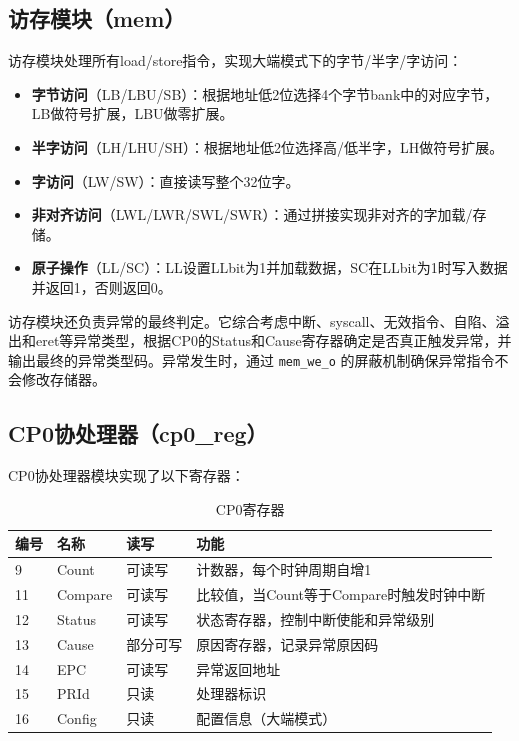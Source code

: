 \subsection{访存模块（mem）}

访存模块处理所有load/store指令，实现大端模式下的字节/半字/字访问：

\begin{itemize}[leftmargin=2em]
    \item \textbf{字节访问}（LB/LBU/SB）：根据地址低2位选择4个字节bank中的对应字节，LB做符号扩展，LBU做零扩展。
    \item \textbf{半字访问}（LH/LHU/SH）：根据地址低2位选择高/低半字，LH做符号扩展。
    \item \textbf{字访问}（LW/SW）：直接读写整个32位字。
    \item \textbf{非对齐访问}（LWL/LWR/SWL/SWR）：通过拼接实现非对齐的字加载/存储。
    \item \textbf{原子操作}（LL/SC）：LL设置LLbit为1并加载数据，SC在LLbit为1时写入数据并返回1，否则返回0。
\end{itemize}

访存模块还负责异常的最终判定。它综合考虑中断、syscall、无效指令、自陷、溢出和eret等异常类型，根据CP0的Status和Cause寄存器确定是否真正触发异常，并输出最终的异常类型码。异常发生时，通过 \texttt{mem\_we\_o} 的屏蔽机制确保异常指令不会修改存储器。

\subsection{CP0协处理器（cp0\_reg）}

CP0协处理器模块实现了以下寄存器：

\begin{table}[H]
    \centering
    \caption{CP0寄存器}
    \begin{tabular}{llll}
        \toprule
        \textbf{编号} & \textbf{名称} & \textbf{读写} & \textbf{功能} \\
        \midrule
        9 & Count & 可读写 & 计数器，每个时钟周期自增1 \\
        11 & Compare & 可读写 & 比较值，当Count等于Compare时触发时钟中断 \\
        12 & Status & 可读写 & 状态寄存器，控制中断使能和异常级别 \\
        13 & Cause & 部分可写 & 原因寄存器，记录异常原因码 \\
        14 & EPC & 可读写 & 异常返回地址 \\
        15 & PRId & 只读 & 处理器标识 \\
        16 & Config & 只读 & 配置信息（大端模式） \\
        \bottomrule
    \end{tabular}
\end{table}

